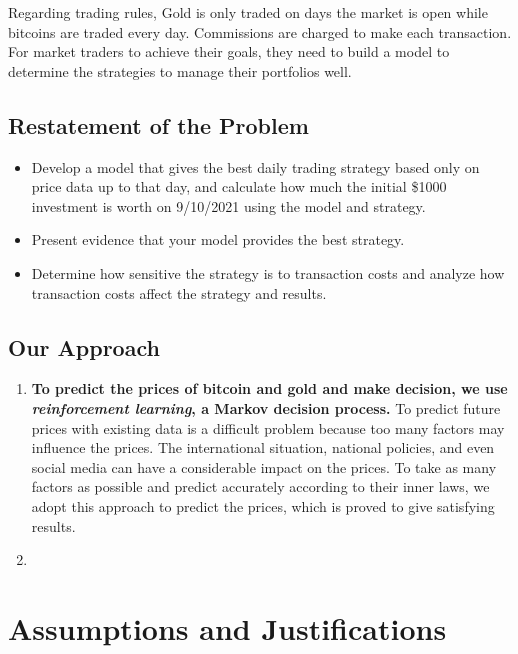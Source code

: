 \documentclass[12pt,a4paper]{article}
\newcommand{\DecisionAlgorithm}{reinforcement learning}
\begin{document}
\begin{spacing}{1.2}
 Regarding trading rules, Gold is only traded on days the market is open while bitcoins are traded every day. Commissions are charged to make each transaction. For market traders to achieve their goals, they need to build a model to determine the strategies to manage their portfolios well.

\subsection{Restatement of the Problem}

\begin{itemize}
	\item Develop a model that gives the best daily trading strategy based only on price data up 
	to that day, and calculate how much the initial \$1000 investment is worth on 9/10/2021 using the 
	model and strategy.
	
	\item Present evidence that your model provides the best strategy.
	
	\item Determine how sensitive the strategy is to transaction costs and analyze how transaction costs
	affect the strategy and results.
	
\end{itemize}

\subsection{Our Approach}

\begin{enumerate}
	\item \textbf{To predict the prices of bitcoin and gold and make decision, we use \textit{\DecisionAlgorithm}, a Markov decision process.}
	To predict future prices with existing data is a difficult problem because too many factors may influence the prices. The international situation, national policies, and even social media can have a considerable impact on the prices. To take as many factors as possible and predict accurately according to their inner laws, we adopt this approach to predict the prices, which is proved to give satisfying results.
	
	\item 
\end{enumerate}

\section{Assumptions and Justifications}
\label{Assumptions_Justifications}


\end{spacing}
\end{document}
